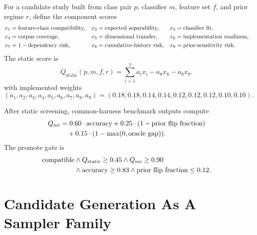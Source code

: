 \documentclass[11pt]{article}
\begin{document}
For a candidate study built from class pair \(p\), classifier \(m\), feature
set \(f\), and prior regime \(r\), define the component scores
\begin{align}
    x_1 &= \text{feature-class compatibility}, &
    x_2 &= \text{expected separability}, &
    x_3 &= \text{classifier fit}, \notag \\
    x_4 &= \text{corpus coverage}, &
    x_5 &= \text{dimensional transfer}, &
    x_6 &= \text{implementation readiness}, \notag \\
    x_7 &= 1 - \text{dependency risk}, &
    x_8 &= \text{cumulative-history risk}, &
    x_9 &= \text{prior-sensitivity risk}.
\end{align}
The static score is
\begin{equation}
    Q_{\text{static}}(p,m,f,r)
    =
    \sum_{i=1}^{7} a_i x_i
    - a_8 x_8
    - a_9 x_9.
\end{equation}
with implemented weights
\[
(a_1,a_2,a_3,a_4,a_5,a_6,a_7,a_8,a_9)
=
(0.18,0.18,0.14,0.14,0.12,0.12,0.12,0.10,0.10).
\]

After static screening, common-harness benchmark outputs compute
\begin{align}
    Q_{\text{mc}}
    &=
    0.60 \cdot \text{accuracy}
    + 0.25 \cdot (1 - \text{prior flip fraction}) \notag \\
    &\quad
    + 0.15 \cdot (1 - \max(0, \text{oracle gap})).
\end{align}
The promote gate is
\begin{align}
    \text{compatible}
    &\land
    Q_{\text{static}} \ge 0.45
    \land
    Q_{\text{mc}} \ge 0.90 \notag \\
    &\land
    \text{accuracy} \ge 0.83
    \land
    \text{prior flip fraction} \le 0.12.
\end{align}

\section{Candidate Generation As A Sampler Family}
\end{document}
